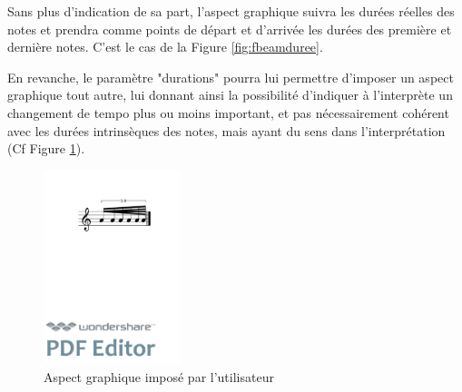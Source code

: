 \documentclass{article}
\newenvironment{gmncode}	{\vspace{-2mm}\small\verbatim}{\endverbatim\vspace{-2mm}}
\begin{document}
Sans plus d'indication de sa part, l'aspect graphique suivra les durées réelles des notes et prendra comme points de départ et d'arrivée les durées des première et dernière notes.  C'est le cas de la Figure \ref{fig:fbeamduree}.

En revanche, le paramètre "durations" pourra lui permettre d'imposer un aspect graphique tout autre, lui donnant ainsi la possibilité d'indiquer à l'interprète un changement de tempo plus ou moins important, et pas nécessairement cohérent avec les durées intrinsèques des notes, mais ayant du sens dans l'interprétation (Cf Figure \ref{fig:utilisateur}).

\begin{figure}[h]
\centering
\begin{gmncode}
[ 
  \fBeam<durations="1/16,1/64", 
  drawDuration="true">
   (a/8 a/16 a a a/32 a) 
]
\end{gmncode}

\includegraphics[width=4cm]{img/durations.pdf}
\caption{Aspect graphique imposé par l'utilisateur}
\label{fig:utilisateur}
\end{figure}
\end{document}
